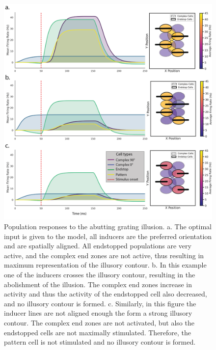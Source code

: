 \documentclass[12pt]{article}
\begin{document}
\begin{figure}[H]
  \centering
  \includegraphics[width=1.0 \textwidth]{adjusted_figures/Figure_Population.png}
  \caption{Population responses to the abutting grating illusion. a. The optimal input is given to the model, all inducers are the preferred orientation and are spatially aligned. All endstopped populations are very active, and the complex end zones are not active, thus resulting in maximum representation of the illusory contour. b. In this example one of the inducers crosses the illusory contour, resulting in the abolishment of the illusion. The complex end zones increase in activity and thus the activity of the endstopped cell also decreased, and no illusory contour is formed. c. Similarly, in this figure the inducer lines are not aligned enough the form a strong illusory contour. The complex end zones are not activated, but also the endstopped cells are not maximally stimulated. Therefore, the pattern cell is not stimulated and no illusory contour is formed.}
  \label{fig:population_contours}
\end{figure}

\newpage
\end{document}

